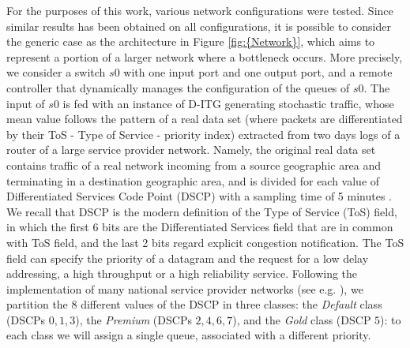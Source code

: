 For the purposes of this work, various network configurations were tested. Since similar results has been obtained on all configurations, it is possible to consider the generic case as the architecture in Figure \ref{fig:{Network}}, which aims to represent a portion of a larger network where a bottleneck occurs. More precisely, we consider a switch $s0$ with one input port and one output port, and a remote controller \cite{OVS, RYU} that dynamically manages the configuration of the queues of $s0$. The input of $s0$ is fed with an instance of D-ITG generating stochastic traffic, whose mean value follows the pattern of a real data set (where packets are differentiated by their ToS - Type of Service - priority index) extracted from two days logs of a router of a large service provider network. Namely, the original real data set contains traffic of a real network incoming from a source geographic area and terminating in a destination geographic area, and is divided for each value of Differentiated Services Code Point (DSCP) with a sampling time of 5 minutes \cite{Baker1998, Babiarz2006}. We recall that DSCP is the modern definition of the Type of Service (ToS) field, in which the first 6 bits are the Differentiated Services field that are in common with ToS field, and the last 2 bits regard explicit congestion notification. The ToS field can specify the priority of a datagram and the request for a low delay addressing, a high throughput or a high reliability service. Following the implementation of many national service provider networks (see e.g. \cite{Notiziario}), we partition the 8 different values of the DSCP in three classes: the \textit{Default} class (DSCPs $0,1,3$), the \textit{Premium} (DSCPs $2,4,6,7$), and the \textit{Gold} class (DSCP $5$): to each class we will assign a single queue, associated with a different priority.



